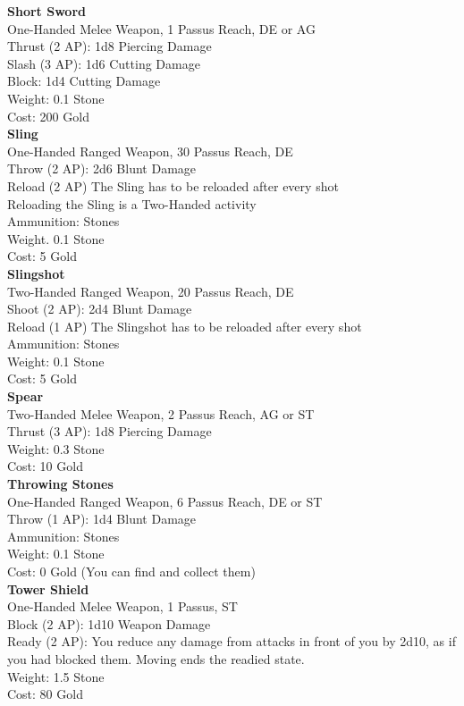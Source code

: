 \textbf{Short Sword}\\
One-Handed Melee Weapon, 1 Passus Reach, DE or AG\\
Thrust (2 AP): 1d8 Piercing Damage\\
Slash (3 AP): 1d6 Cutting Damage\\
Block: 1d4 Cutting Damage\\
Weight: 0.1 Stone\\
Cost: 200 Gold\\


\textbf{Sling}\\
One-Handed Ranged Weapon, 30 Passus Reach, DE\\
Throw (2 AP): 2d6 Blunt Damage\\
Reload (2 AP) The Sling has to be reloaded after every shot\\
Reloading the Sling is a Two-Handed activity\\
Ammunition: Stones\\
Weight. 0.1 Stone\\
Cost: 5 Gold\\


\textbf{Slingshot}\\
Two-Handed Ranged Weapon, 20 Passus Reach, DE\\
Shoot (2 AP): 2d4 Blunt Damage\\
Reload (1 AP) The Slingshot has to be reloaded after every shot\\
Ammunition: Stones\\
Weight: 0.1 Stone\\
Cost: 5 Gold\\


\textbf{Spear}\\
Two-Handed Melee Weapon, 2 Passus Reach, AG or ST\\
Thrust (3 AP): 1d8 Piercing Damage\\
Weight: 0.3 Stone\\
Cost: 10 Gold\\


\textbf{Throwing Stones}\\
One-Handed Ranged Weapon, 6 Passus Reach, DE or ST\\
Throw (1 AP): 1d4 Blunt Damage\\
Ammunition: Stones\\
Weight: 0.1 Stone\\
Cost: 0 Gold (You can find and collect them)\\


\textbf{Tower Shield}\\
One-Handed Melee Weapon, 1 Passus, ST\\
Block (2 AP): 1d10 Weapon Damage\\
Ready (2 AP): You reduce any damage from attacks in front of you by 2d10, as if you had blocked them. Moving ends the readied state.\\
Weight: 1.5 Stone\\
Cost: 80 Gold\\



